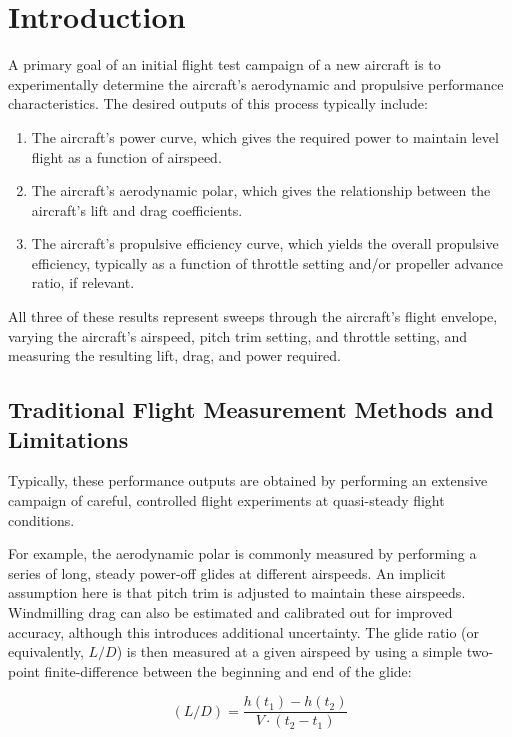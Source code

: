 \documentclass[conf]{new-aiaa}
\begin{document}
    \section{Introduction}

    A primary goal of an initial flight test campaign of a new aircraft is to experimentally determine the aircraft's aerodynamic and propulsive performance characteristics. The desired outputs of this process typically include:

    \begin{enumerate}
        \item The aircraft's power curve, which gives the required power to maintain level flight as a function of airspeed.
        \item The aircraft's aerodynamic polar, which gives the relationship between the aircraft's lift and drag coefficients.
        \item The aircraft's propulsive efficiency curve, which yields the overall propulsive efficiency, typically as a function of throttle setting and/or propeller advance ratio, if relevant.
    \end{enumerate}

    All three of these results represent sweeps through the aircraft's flight envelope, varying the aircraft's airspeed, pitch trim setting, and throttle setting, and measuring the resulting lift, drag, and power required.

    \subsection{Traditional Flight Measurement Methods and Limitations}

    Typically, these performance outputs are obtained by performing an extensive campaign of careful, controlled flight experiments at quasi-steady flight conditions.

    For example, the aerodynamic polar is commonly measured by performing a series of long, steady power-off glides at different airspeeds. An implicit assumption here is that pitch trim is adjusted to maintain these airspeeds. Windmilling drag can also be estimated and calibrated out for improved accuracy, although this introduces additional uncertainty. The glide ratio (or equivalently, $L/D$) is then measured at a given airspeed by using a simple two-point finite-difference between the beginning and end of the glide:

    $$(L/D) = \frac{h(t_1) - h(t_2)}{V \cdot (t_2 - t_1)}$$
\end{document}
